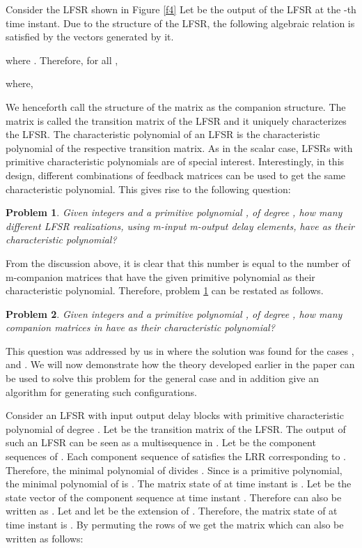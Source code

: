 \documentclass[letterpaper, 12 pt]{article}  \usepackage{amssymb}
\newtheorem{problem}{Problem}
\begin{document}
Consider the LFSR shown in Figure \ref{f4} 
Let  be the output
of the LFSR at the
-th time instant. Due to the structure of the LFSR, the following algebraic
relation is satisfied by the vectors generated by it. 

where . Therefore, for all ,

where,

We henceforth call the structure of the matrix  as the companion
structure. The matrix  is called the transition matrix of the LFSR and
it uniquely characterizes the LFSR.  The characteristic
polynomial
of an LFSR is the characteristic polynomial of the respective transition matrix.
As in the scalar case,  LFSRs with primitive characteristic polynomials are
of special interest. Interestingly, in this design, different combinations of
feedback matrices can be used to get the same characteristic polynomial. This
gives rise to the following question:
 \begin{problem}
\label{mainproblem}
 Given integers  and a primitive polynomial , of degree , how
many different LFSR realizations, using m-input m-output delay elements, have
 as their characteristic polynomial?
\end{problem}
From the discussion above, it is clear that this
number is equal to the number of m-companion matrices that have the given
primitive polynomial as their characteristic polynomial. 
Therefore, problem \ref{mainproblem} can be restated as follows.
\begin{problem}
  Given integers  and a primitive polynomial , of degree ,
how many companion matrices in  have  as their
characteristic polynomial?
\end{problem}

This question was addressed by us in \cite{HP} where the solution was found for
the cases ,  and . We will now demonstrate how the theory
developed earlier in the paper can be used to solve this problem for the
general case and in addition give an algorithm for generating such
configurations.

Consider an LFSR with input output delay blocks with
primitive characteristic polynomial  of degree . Let  be
the transition matrix of the LFSR.
The output of such an LFSR can be seen as a
multisequence  in . 
Let  be the component sequences of . Each component
sequence of  satisfies the LRR corresponding to . Therefore, the
minimal polynomial of  divides . Since  is a primitive
polynomial, the minimal polynomial of  is . The matrix state of 
at time instant  is . Let  be the state vector of the
component sequence  at time instant . Therefore  can also be
written as . Let  and let  be the
extension of . Therefore, the matrix state of  at time instant 
is . By permuting the rows of  we get the
matrix  
 which can also be written as follows:
\end{document}
